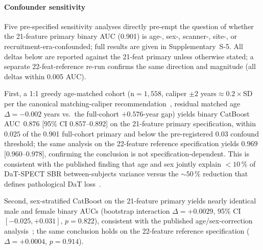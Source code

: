 \paragraph*{Confounder sensitivity}
\label{p1:sec:discussion:confounders}
Five pre-specified sensitivity analyses directly pre-empt the question of whether the 21-feature primary binary AUC (0.901) is age-, sex-, scanner-, site-, or recruitment-era-confounded; full results are given in Supplementary~S-5. All deltas below are reported against the 21-feat primary unless otherwise stated; a separate 22-feat-reference re-run confirms the same direction and magnitude (all deltas within 0.005 AUC).

First, a 1:1 greedy age-matched cohort (n${=}1{,}558$, caliper $\pm 2$ years${\approx}0.2{\times}\mathrm{SD}$ per the canonical matching-caliper recommendation~\cite{austin2011caliper}, residual matched age~$\Delta{=}{-}0.002$ years vs.\ the full-cohort $+0.576$-year gap) yields binary CatBoost AUC~$0.876$ [95\% CI $0.857$--$0.892$] on the 21-feature primary specification, within $0.025$ of the 0.901 full-cohort primary and below the pre-registered $0.03$ confound threshold; the same analysis on the 22-feature reference specification yields $0.969$ [$0.960$--$0.978$], confirming the conclusion is not specification-dependent. This is consistent with the published finding that age and sex jointly explain $<\!10\,\%$ of DaT-SPECT SBR between-subjects variance versus the ${\sim}50\,\%$ reduction that defines pathological DaT loss~\cite{schmitzSteinkruger2021age,eusebi2017dat,varrone2013ageadjusted}.

Second, sex-stratified CatBoost on the 21-feature primary yields nearly identical male and female binary AUCs (bootstrap interaction $\Delta{=}{+}0.0029$, 95\% CI~$[-0.025, +0.031]$, $p{=}0.822$), consistent with the published age/sex-correction analysis~\cite{schmitzSteinkruger2021age}; the same conclusion holds on the 22-feature reference specification ($\Delta{=}{+}0.0004$, $p{=}0.914$).

